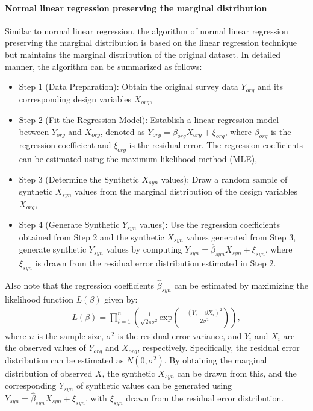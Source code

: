 \paragraph{Normal linear regression preserving the marginal distribution}
Similar to normal linear regression, the algorithm of normal linear regression preserving the marginal distribution is based on the linear regression technique but maintains the marginal distribution of the original dataset. In detailed manner, the algorithm can be summarized as follows:
\begin{itemize}
    \item Step 1 (Data Preparation): Obtain the original survey data $Y_{org}$ and its corresponding design variables $X_{org}$,
    \item Step 2 (Fit the Regression Model): Establish a linear regression model between $Y_{org}$ and $X_{org}$, denoted as $Y_{org} = \beta_{org}X_{org} + \xi_{org}$, where $\beta_{org}$ is the regression coefficient and $\xi_{org}$ is the residual error. The regression coefficients can be estimated using the maximum likelihood method (MLE),
    \item Step 3 (Determine the Synthetic $X_{syn}$ values): Draw a random sample of synthetic $X_{syn}$ values from the marginal distribution of the design variables $X_{org}$,
    \item Step 4 (Generate Synthetic $Y_{syn}$ values): Use the regression coefficients obtained from Step 2 and the synthetic $X_{syn}$ values generated from Step 3, generate synthetic $Y_{syn}$ values by computing $Y_{syn} = \hat{\beta}_{syn}X_{syn} + \xi_{syn}$, where $\xi_{syn}$ is drawn from the residual error distribution estimated in Step 2.
\end{itemize}
Also note that the regression coefficients $\hat{\beta}_{syn}$ can be estimated by maximizing the likelihood function $L(\beta)$ given by:
\begin{align}
    \label{equ:mle}
    L(\beta)=\prod_{i=1}^{n}(\frac{1}{\sqrt{2\pi \sigma^2}}\text{exp}(-\frac{(Y_{i}-\beta X_{i})^2}{2\sigma^2})),
\end{align}
where $n$ is the sample size, $\sigma^2$ is the residual error variance, and $Y_i$ and $X_i$ are the observed values of $Y_{org}$ and $X_{org}$, respectively. Specifically, the residual error distribution can be estimated as $N(0, \sigma^2)$. By obtaining the marginal distribution of observed $X$, the synthetic $X_{syn}$ can be drawn from this, and the corresponding $Y_{syn}$ of synthetic values can be generated using $Y_{syn}=\hat{\beta}_{syn}X_{syn}+\xi_{syn}$, with $\xi_{syn}$ drawn from the residual error distribution.

